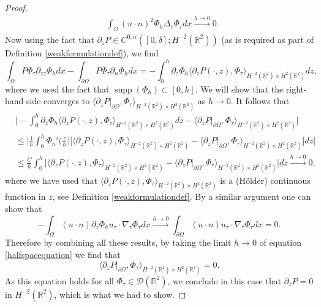 \documentclass[12pt,a4paper]{article}
\theoremstyle{definition}
\theoremstyle{remark}
\numberwithin{equation}{section}
\DeclareMathOperator{\supp}{supp}
\begin{document}
\begin{proof}
\begin{align*}
&\int_\Omega (u \cdot n)^2 \Phi_h \Delta_\tau \Phi_\tau dx \xrightarrow[]{h \rightarrow 0} 0.
\end{align*}
Now using the fact that $\partial_z P \in C^{0,\alpha} ( [0, \delta]; H^{-2} (\mathbb{R}^2))$ (as is required as part of Definition \ref{weakformulationdef}), we find
\begin{equation*}
\int_\Omega P \Phi_\tau \partial_{zz} \Phi_h dx - \int_{\partial \Omega} P \Phi_\tau \partial_n \Phi_h dx = - \int_0^h \partial_z \Phi_h \langle \partial_z P (\cdot, z), \Phi_\tau \rangle_{H^{-2} (\mathbb{R}^2) \times H^2 (\mathbb{R}^2)} dz,
\end{equation*}
where we used the fact that $\supp (\Phi_h) \subset [0,h]$. We will show that the right-hand side converges to $\langle \partial_z P \lvert_{\partial \Omega} , \Phi_\tau \rangle_{H^{-2} (\mathbb{R}^2) \times H^2 (\mathbb{R}^2)}$ as $h \rightarrow 0$. It follows that
\begin{align*}
&\bigg\lvert - \int_0^h \partial_z \Phi_h \langle \partial_z P (\cdot, z), \Phi_\tau \rangle_{H^{-2} (\mathbb{R}^2) \times H^2 (\mathbb{R}^2)} dz - \langle \partial_z P \lvert_{\partial \Omega} , \Phi_\tau \rangle_{H^{-2} (\mathbb{R}^2) \times H^2 (\mathbb{R}^2)} \bigg\rvert \\
&\leq \bigg\lvert \frac{1}{h} \int_0^h \Phi_n' \bigg( \frac{z}{h} \bigg) \bigg[ \langle \partial_z P (\cdot, z), \Phi_\tau \rangle_{H^{-2} (\mathbb{R}^2) \times H^2 (\mathbb{R}^2)} - \langle \partial_z P \lvert_{\partial \Omega} , \Phi_\tau \rangle_{H^{-2} (\mathbb{R}^2) \times H^2 (\mathbb{R}^2)} \bigg] dz \bigg\rvert \\
&\leq \frac{C}{h} \int_0^h \big\lvert \langle \partial_z P (\cdot, z), \Phi_\tau \rangle_{H^{-2} (\mathbb{R}^2) \times H^2 (\mathbb{R}^2)} - \langle \partial_z P \lvert_{\partial \Omega} , \Phi_\tau \rangle_{H^{-2} (\mathbb{R}^2) \times H^2 (\mathbb{R}^2)} \big\rvert dz \xrightarrow[]{h \rightarrow 0} 0,
\end{align*}
where we have used that $\langle \partial_z P (\cdot, z) , \Phi_\tau \rangle_{H^{-2} (\mathbb{R}^2) \times H^2 (\mathbb{R}^2)}$ is a (Hölder) continuous function in $z$, see Definition \ref{weakformulationdef}. By a similar argument one can show that
\begin{equation*}
- \int_\Omega (u \cdot n) \partial_z \Phi_h u_\tau \cdot \nabla_\tau \Phi_\tau  dx \xrightarrow[]{h \rightarrow 0} \int_{\partial \Omega} (u \cdot n) u_\tau \cdot \nabla_\tau \Phi_\tau  dx = 0.
\end{equation*}
Therefore by combining all these results, by taking the limit $h \rightarrow 0$ of equation \eqref{halfspacequation} we find that 
\begin{equation}
\langle \partial_z P \lvert_{\partial \Omega} , \Phi_\tau \rangle_{H^{-2} (\mathbb{R}^2) \times H^2 (\mathbb{R}^2)} = 0.
\end{equation}
As this equation holds for all $\Phi_\tau \in \mathcal{D} (\mathbb{R}^2)$, we conclude in this case that $\partial_z P = 0$ in $H^{-2} (\mathbb{R}^2)$, which is what we had to show. 


\end{proof}
\end{document}
